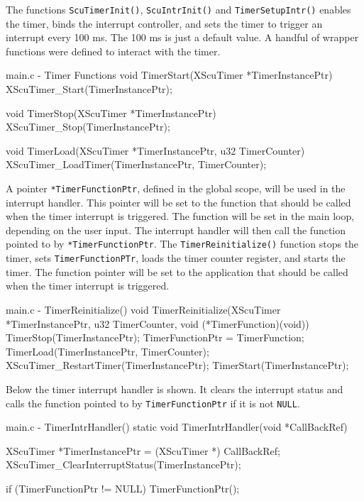 \documentclass[../main.tex]{subfiles}
\begin{document}
\newpage

The functions \texttt{ScuTimerInit()}, \texttt{ScuIntrInit()} and \texttt{TimerSetupIntr()} enables the timer, binds the interrupt controller, and sets the timer to trigger an interrupt every 100 ms. The 100 ms is just a default value. A handful of wrapper functions were defined to interact with the timer.

\begin{myminted}{main.c - Timer Functions}
void TimerStart(XScuTimer *TimerInstancePtr)
{
    XScuTimer_Start(TimerInstancePtr);
}

void TimerStop(XScuTimer *TimerInstancePtr)
{
    XScuTimer_Stop(TimerInstancePtr);
}

void TimerLoad(XScuTimer *TimerInstancePtr, u32 TimerCounter)
{
    XScuTimer_LoadTimer(TimerInstancePtr, TimerCounter);
}
\end{myminted}

A pointer \texttt{*TimerFunctionPtr}, defined in the global scope, will be used in the interrupt handler. This pointer will be set to the function that should be called when the timer interrupt is triggered. The function will be set in the main loop, depending on the user input. The interrupt handler will then call the function pointed to by \texttt{*TimerFunctionPtr}. The \texttt{TimerReinitialize()} function stops the timer, sets \texttt{TimerFunctionPTr}, loads the timer counter register, and starts the timer. The function pointer will be set to the application that should be called when the timer interrupt is triggered.

\begin{myminted}{main.c - TimerReinitialize()}
void TimerReinitialize(XScuTimer *TimerInstancePtr, u32 TimerCounter, void (*TimerFunction)(void))
{
	TimerStop(TimerInstancePtr);
	TimerFunctionPtr = TimerFunction;
	TimerLoad(TimerInstancePtr, TimerCounter);
	XScuTimer_RestartTimer(TimerInstancePtr);
	TimerStart(TimerInstancePtr);
}
\end{myminted}

Below the timer interrupt handler is shown. It clears the interrupt status and calls the function pointed to by \texttt{TimerFunctionPtr} if it is not \texttt{NULL}.

\newpage

\begin{myminted}{main.c - TimerIntrHandler()}
static void TimerIntrHandler(void *CallBackRef)
{
    XScuTimer *TimerInstancePtr = (XScuTimer *) CallBackRef;
    XScuTimer_ClearInterruptStatus(TimerInstancePtr);

    if (TimerFunctionPtr != NULL) {
        TimerFunctionPtr();
    }
}
\end{myminted}
\end{document}
